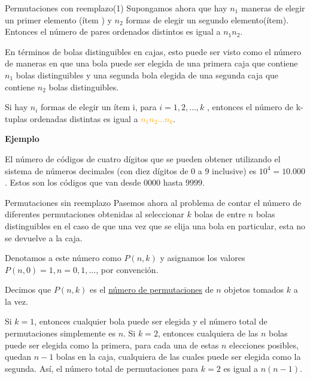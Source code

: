 \documentclass[10pt]{beamer}
\begin{document}
\begin{frame}{Permutaciones con reemplazo(1)}
Supongamos ahora que hay $n_1$ maneras de elegir un primer elemento (\'item ) y $n_2$ formas de elegir un segundo elemento(\'item). Entonces el n\'umero de pares ordenados distintos es igual a $n_1n_2$. 


En t\'erminos de bolas distinguibles en cajas, esto puede ser visto como el n\'umero de maneras en que una bola puede ser elegida de una primera caja que contiene $n_1$ bolas distinguibles y una segunda bola elegida de una segunda caja que contiene $n_2$ bolas distinguibles.  


Si hay $n_i$ formas de elegir un \'item i, para $i = 1,2,\dots, k$ , entonces el n\'umero de k-tuplas ordenadas distintas es igual a \textcolor{orange}{ $n_1n_2\dots n_k$}.

\vspace{0.2cm}

\small{
	
	\textbf{Ejemplo}
	
	El n\'umero de c\'odigos de cuatro d\'igitos que se pueden obtener utilizando el sistema de n\'umeros decimales (con diez d\'igitos de $0$ a $9$ inclusive) es $10^4 = 10.000$. Estos son los c\'odigos que van desde $0000$ hasta $9999$.
}

\end{frame}

\begin{frame}{Permutaciones sin  reemplazo}
Pasemos ahora al problema de contar el n\'umero de diferentes permutaciones obtenidas al seleccionar $k$ bolas de entre $n$ bolas distinguibles en el caso de que una vez que se elija una bola en  particular, esta  no se devuelve a la caja.
	
Denotamos a este n\'umero como  $P(n, k)$ y asignamos los valores $P(n, 0) = 1, n = 0,1,\dots $, por convenci\'on.

Decimos que $P(n, k)$ es el \underline{n\'umero de permutaciones} de $n$ objetos tomados $k$ a la vez.
	
\vspace{0.2cm}
	
\small{Si $k = 1$, entonces cualquier bola puede ser elegida y el n\'umero total de permutaciones  simplemente es  $n$. Si $k = 2$, entonces cualquiera de las $n$ bolas puede ser elegida como la primera, para cada una de estas $n$ elecciones posibles, quedan $n - 1$ bolas en la caja, cualquiera de las cuales puede ser elegida como la segunda. As\'i, el n\'umero total de permutaciones para $k = 2$ es igual a $n (n - 1)$.}
\end{frame}
\end{document}
